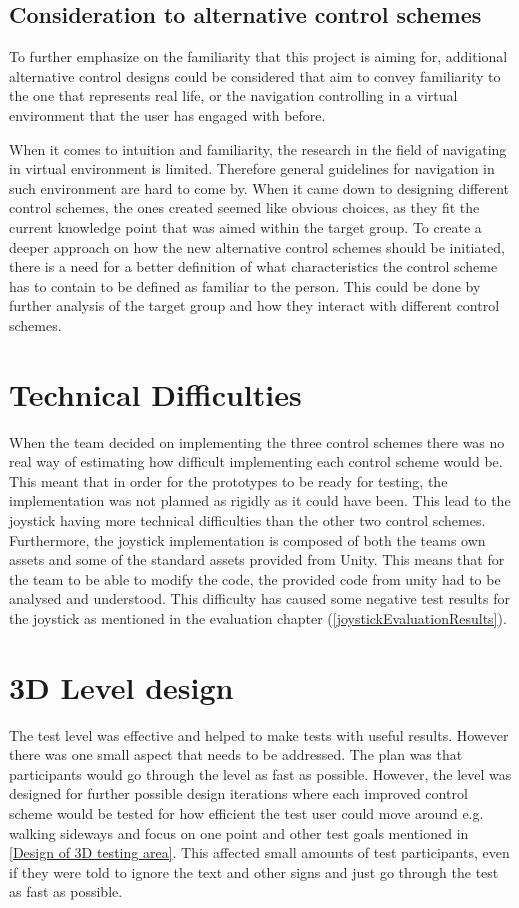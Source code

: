 \subsection*{Consideration to alternative control schemes}
To further emphasize on the familiarity that this project is aiming for, additional alternative control designs could be considered that aim to convey familiarity to the one that represents real life, or the navigation controlling in a virtual environment that the user has engaged with before.

When it comes to intuition and familiarity, the research in the field of navigating in virtual environment is limited. Therefore general guidelines for navigation in such environment are hard to come by. When it came down to designing different control schemes, the ones created seemed like obvious choices, as they fit the current knowledge point that was aimed within the target group. To create a deeper approach on how the new alternative control schemes should be initiated, there is a need for a better definition of what characteristics the control scheme has to contain to be defined as familiar to the person. This could be done by further analysis of the target group and how they interact with different control schemes.

\section*{Technical Difficulties}
When the team decided on implementing the three control schemes there was no real way of estimating how difficult implementing each control scheme would be. This meant that in order for the prototypes to be ready for testing, the implementation was not planned as rigidly as it could have been. This lead to the joystick having more technical difficulties than the other two control schemes. Furthermore, the joystick implementation is composed of both the teams own assets and some of the standard assets provided from Unity. This means that for the team to be able to modify the code, the provided code from unity had to be analysed and understood. This difficulty has caused some negative test results for the joystick as mentioned in the evaluation chapter (\ref{joystickEvaluationResults}). 

\section*{3D Level design}
The test level was effective and helped to make tests with useful results. However there was one small aspect that needs to be addressed. The plan was that participants would go through the level as fast as possible. However, the level was designed for further possible design iterations where each improved control scheme would be tested for how efficient the test user could move around e.g. walking sideways and focus on one point and other test goals mentioned in \ref {Design of 3D testing area}. This affected small amounts of test participants, even if they were told to ignore the text and other signs and just go through the test as fast as possible. 


